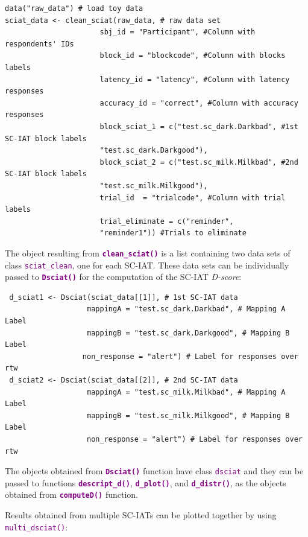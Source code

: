 \documentclass[a0,landscape]{a0poster}
\begin{document}
\begin{multicols*}{3}
\begin{lstlisting}
data("raw_data") # load toy data 
sciat_data <- clean_sciat(raw_data, # raw data set
                      sbj_id = "Participant", #Column with respondents' IDs
                      block_id = "blockcode", #Column with blocks labels
                      latency_id = "latency", #Column with latency responses
                      accuracy_id = "correct", #Column with accuracy responses
                      block_sciat_1 = c("test.sc_dark.Darkbad", #1st SC-IAT block labels
                      "test.sc_dark.Darkgood"),
                      block_sciat_2 = c("test.sc_milk.Milkbad", #2nd SC-IAT block labels
                      "test.sc_milk.Milkgood"),
                      trial_id  = "trialcode", #Column with trial labels
                      trial_eliminate = c("reminder", 
                      "reminder1")) #Trials to eliminate
\end{lstlisting}	

The object resulting from \textbf{\textcolor{purple}{\texttt{clean\_sciat()}}} is a list containing two data sets of class \textcolor{purple}{\texttt{sciat\_clean}}, one for each SC-IAT. These data sets can be individually passed to \textbf{\textcolor{purple}{\texttt{Dsciat()}}} for the computation of the SC-IAT \emph{D-score}: 
\begin{lstlisting}
 d_sciat1 <- Dsciat(sciat_data[[1]], # 1st SC-IAT data
                   mappingA = "test.sc_dark.Darkbad", # Mapping A Label
                   mappingB = "test.sc_dark.Darkgood", # Mapping B Label
                  non_response = "alert") # Label for responses over rtw
 d_sciat2 <- Dsciat(sciat_data[[2]], # 2nd SC-IAT data
                   mappingA = "test.sc_milk.Milkbad", # Mapping A Label
                   mappingB = "test.sc_milk.Milkgood", # Mapping B Label
                   non_response = "alert") # Label for responses over rtw
\end{lstlisting}	

The objects obtained from \textbf{\textcolor{purple}{\texttt{Dsciat()}}} function have class \textcolor{purple}{\texttt{dsciat}} and they can be passed to functions \textbf{\textcolor{purple}{\texttt{descript\_d()}}}, \textbf{\textcolor{purple}{\texttt{d\_plot()}}}, and \textbf{\textcolor{purple}{\texttt{d\_distr()}}}, as the objects obtained from \textbf{\textcolor{purple}{\texttt{computeD()}}} function. 

Results obtained from multiple SC-IATs can be plotted together by using \textcolor{purple}{\texttt{multi\_dsciat()}}: 


\end{multicols*}
\end{document}
